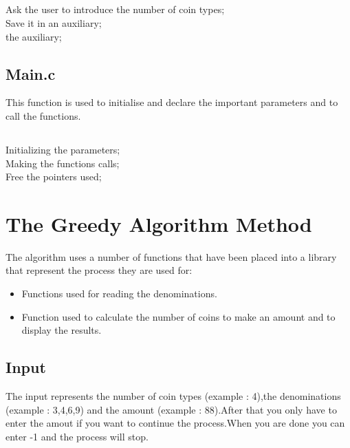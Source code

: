 \documentclass{report}
\begin{document}
\subsection*{}

\begin{algorithm}[H]
    {Ask the user to introduce the number of coin types;}
    \\
    {Save it in an auxiliary;}
    \\
    \Return the auxiliary;
    \caption{Reading the number of coin types.}
\end{algorithm}

\subsection*{Main.c}
This function is used to initialise and declare the important parameters and to call the functions.
\subsection*{}

\begin{algorithm}[H]
    {Initializing the parameters;}
    \\
    {Making the functions calls;}
    \\
    {Free the pointers used;}
    \caption{Main.c.}
\end{algorithm}

\subsection*{}
\section*{The Greedy Algorithm Method}
The algorithm uses a number of functions that have been placed into a library that represent the process they are used for:
\begin{itemize}
    \item Functions used for reading the denominations.
    \item Function used to calculate the number of coins to make an amount and to display the results.
\end{itemize}

\subsection*{Input}
The input represents the number of coin types (example : 4),the denominations (example : 3,4,6,9) and the amount (example : 88).After that you only have to enter the amout if you want to continue the process.When you are done you can enter -1 and the process will stop.
\end{document}
